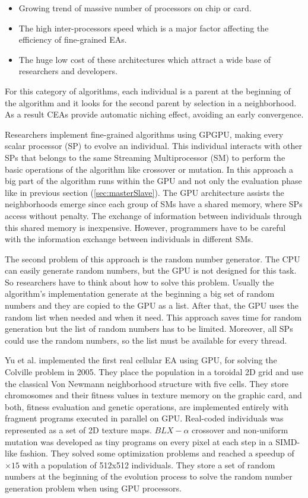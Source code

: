 \documentclass{comjnl}
\begin{document}
\begin{itemize}
\item Growing trend of massive number of processors on chip or card. 
\item The high inter-processors speed which is a major factor affecting the efficiency of fine-grained EAs. 
\item The huge low cost of these architectures which attract a wide base of researchers and developers. 
\end{itemize}

For this category of algorithms, each individual is a parent at the beginning of the algorithm and it looks for the second parent by selection in a neighborhood. As a result CEAs provide automatic niching effect, avoiding an early convergence. 

Researchers implement fine-grained algorithms using GPGPU, making every scalar processor (SP) to evolve an individual. This individual interacts with other SPs that belongs to the same Streaming Multiprocessor (SM) to perform the basic operations of the algorithm like crossover or mutation. In this approach a big part of the algorithm runs within the GPU and not only the evaluation phase like in previous section (\ref{sec:masterSlave}). The GPU architecture assists the neighborhoods emerge since each group of SMs have a shared memory, where SPs access without penalty. The exchange of information between individuals through this shared memory is inexpensive. However, programmers have to be careful with the information exchange between individuals in different SMs. 

The second problem of this approach is the random number generator. The CPU can easily generate random numbers, but the GPU is not designed for this task. So researchers have to think about how to solve this problem. Usually the algorithm's implementation generate at the beginning a big set of random numbers and they are copied to the GPU as a list. After that, the GPU uses the random list when needed and when it need. This approach saves time for random generation but the list of random numbers has to be limited. Moreover, all SPs could use the random numbers, so the list must be available for every thread. 


Yu et al. \cite{yu-parallel-2005} implemented the first real cellular EA using GPU, for solving the Colville problem \cite{Ng:2005:DFF:1064290.1064296} in 2005. They place the population in a toroidal 2D grid and use the classical Von Newmann neighborhood structure with five cells. They store chromosomes and their fitness values in texture memory on the graphic card, and both, fitness evaluation and genetic operations, are implemented entirely with fragment programs executed in parallel on GPU. Real-coded individuals was represented as a set of 2D texture maps. $BLX-\alpha$ crossover and non-uniform mutation was developed as tiny programs on every pixel at each step in a SIMD-like fashion. They solved some optimization problems and reached a speedup of $\times15$ with a population of 512x512 individuals. They store a set of random numbers at the beginning of the evolution process to solve the random number generation problem when using GPU processors. 
\end{document}
